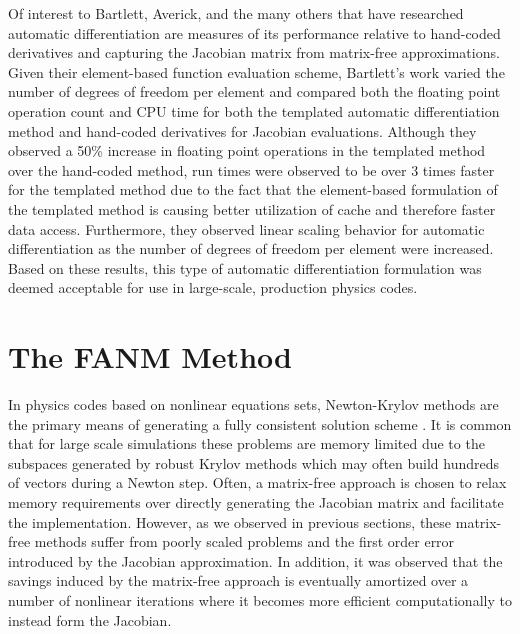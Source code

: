 Of interest to Bartlett, Averick, and the many others that have
researched automatic differentiation are measures of its performance
relative to hand-coded derivatives and capturing the Jacobian matrix
from matrix-free approximations. Given their element-based function
evaluation scheme, Bartlett's work varied the number of degrees of
freedom per element and compared both the floating point operation
count and CPU time for both the templated automatic differentiation
method and hand-coded derivatives for Jacobian evaluations. Although
they observed a 50\% increase in floating point operations in the
templated method over the hand-coded method, run times were observed
to be over 3 times faster for the templated method due to the fact
that the element-based formulation of the templated method is causing
better utilization of cache and therefore faster data
access. Furthermore, they observed linear scaling behavior for
automatic differentiation as the number of degrees of freedom per
element were increased. Based on these results, this type of automatic
differentiation formulation was deemed acceptable for use in
large-scale, production physics codes.

\section{The FANM Method\ }
\label{sec:fanm}
In physics codes based on nonlinear equations sets, Newton-Krylov
methods are the primary means of generating a fully consistent
solution scheme
\cite{evans_development_2006,evans_enhanced_2007,gaston_parallel_2009,godoy_parallel_2012}. It
is common that for large scale simulations these problems are memory
limited due to the subspaces generated by robust Krylov methods which
may often build hundreds of vectors during a Newton step. Often, a
matrix-free approach is chosen to relax memory requirements over
directly generating the Jacobian matrix and facilitate the
implementation. However, as we observed in previous sections, these
matrix-free methods suffer from poorly scaled problems and the first
order error introduced by the Jacobian approximation. In addition, it
was observed that the savings induced by the matrix-free approach is
eventually amortized over a number of nonlinear iterations where it
becomes more efficient computationally to instead form the Jacobian.

